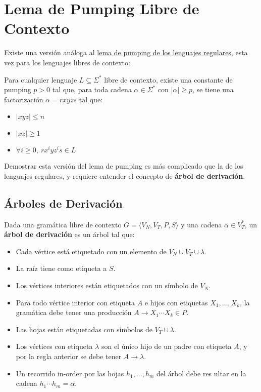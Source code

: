 \section{Lema de Pumping Libre de Contexto}
\label{pumping-libre-de-contexto}

Existe una versión análoga al \hyperref[pumping-regulares]{lema de pumping de los lenguajes regulares}, esta vez para los lenguajes libres de contexto:

\begin{theorem*}
    Para cualquier lenguaje $L \subseteq \Sigma^*$ libre de contexto, existe una constante de pumping $p > 0$ tal que, para toda cadena $\alpha \in \Sigma^*$ con $|\alpha| \geq p$, se tiene una factorización $\alpha = r x y z s$ tal que:
    \begin{itemize}
        \item $|xyz| \leq n$
        \item $|xz| \geq 1$
        \item $\forall i \geq 0,\ r x^i y z^i s \in L$
    \end{itemize}
\end{theorem*}

Demostrar esta versión del lema de pumping es más complicado que la de los lenguajes regulares, y requiere entender el concepto de \textbf{árbol de derivación}.

\subsection{Árboles de Derivación}

Dada una gramática libre de contexto $G = \langle V_N, V_T, P, S \rangle$ y una cadena $\alpha \in V_T^*$, un \textbf{árbol de derivación} es un árbol tal que:
\begin{itemize}
    \item Cada vértice está etiquetado con un elemento de $V_N \cup V_T \cup \lambda$.
    \item La raíz tiene como etiqueta a $S$.
    \item Los vértices interiores están etiquetados con un símbolo de $V_N$.
    \item Para todo vértice interior con etiqueta $A$ e hijos con etiquetas $X_1, \dots, X_k$, la gramática debe tener una producción $A \to X_1 \cdots X_k \in P$.
    \item Las hojas están etiquetadas con símbolos de $V_T \cup \lambda$.
    \item Los vértices con etiqueta $\lambda$ son el único hijo de un padre con etiqueta $A$, y por la regla anterior se debe tener $A \to \lambda$.
    \item Un recorrido in-order por las hojas $h_1, \dots, h_m$ del árbol debe res ultar en la cadena $h_1 \cdots h_m = \alpha$.
\end{itemize}

